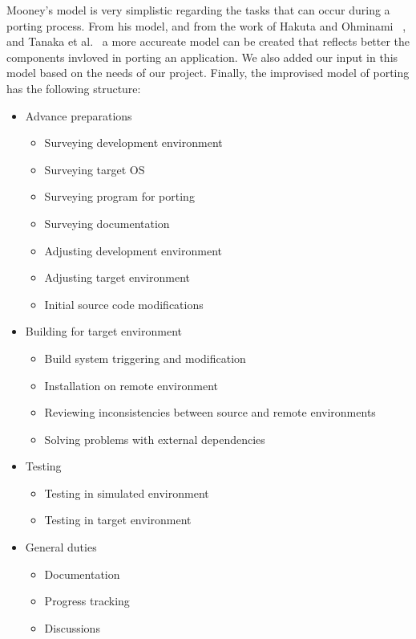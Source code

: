 Mooney's model is very simplistic regarding the tasks that can occur during
a porting process. From his model, and from the work of Hakuta and Ohminami~
\cite{b2}, and Tanaka et al.~\cite{b1} a more accureate model can be created that
reflects better the components invloved in porting an application. We also added
our input in this model based on the needs of our project. Finally, the
improvised model of porting has the following structure:
\begin{itemize}
    \item Advance preparations
        \begin{itemize}
            \item Surveying development environment
            \item Surveying target OS
            \item Surveying program for porting
            \item Surveying documentation
            \item Adjusting development environment
            \item Adjusting target environment
            \item Initial source code modifications
        \end{itemize}
    \item Building for target environment
        \begin{itemize}
            \item Build system triggering and modification
            \item Installation on remote environment
            \item Reviewing inconsistencies between source and remote
            environments
            \item Solving problems with external dependencies
        \end{itemize}
    \item Testing
        \begin{itemize}
            \item Testing in simulated environment
            \item Testing in target environment
        \end{itemize}
    \item General duties
        \begin{itemize}
            \item Documentation
            \item Progress tracking
            \item Discussions
        \end{itemize}
\end{itemize}

